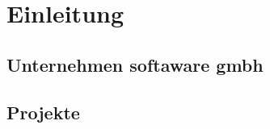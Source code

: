 \chapter{Einleitung}
\label{cha:introduction}

\section{Unternehmen softaware gmbh}
\label{sec:softaware}

\section{Projekte}
\label{sec:projects}
